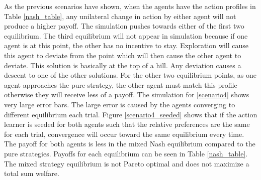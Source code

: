 \documentclass[letterpaper, 10 pt, conference]{ieeeconf}  %
\begin{document}
As the previous scenarios have shown, when the agents have the action profiles in  Table \ref{nash_table}, any unilateral change in action by either agent will not produce a higher payoff.  The simulation pushes towards either of the first two equilibrium.  The third equilibrium will not appear in simulation because if one agent is at this point, the other has no incentive to stay.  Exploration will cause this agent to deviate from the point which will then cause the other agent to deviate.  This solution is basically at the top of a hill.  Any deviation causes a descent to one of the other solutions.  For the other two equilibrium points, as one agent approaches the pure strategy, the other agent must match this profile otherwise they will receive less of a payoff.  The simulation for \ref{scenario4} shows very large error bars.  The large error is caused by the agents converging to different equilibrium each trial.  Figure \ref{scenario4_seeded} shows that if the action learner is seeded for both agents such that the relative preferences are the same for each trial, convergence will occur toward the same equilibrium every time.  The payoff for both agents is less in the mixed Nash equilibrium compared to the pure strategies.  Payoffs for each equilibrium can be seen in Table \ref{nash_table}.  The mixed strategy equilibrium is not Pareto optimal and does not maximize a total sum welfare.
\end{document}
